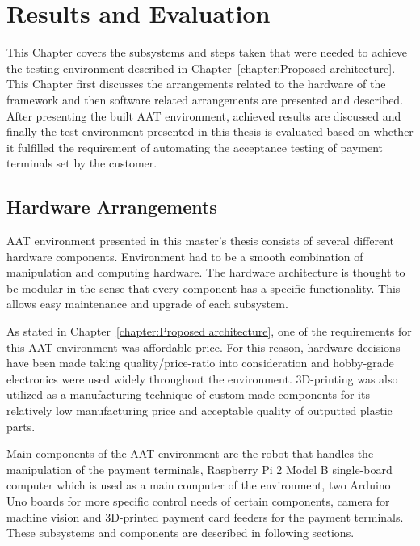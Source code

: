 
\chapter{Results and Evaluation}
\label{chapter:Results and Evaluation}

This Chapter covers the subsystems and steps taken that were needed to achieve the testing environment described in Chapter~\ref{chapter:Proposed architecture}. This Chapter first discusses the arrangements related to the hardware of the framework and then software related arrangements are presented and described. After presenting the built AAT environment, achieved results are discussed and finally the test environment presented in this thesis is evaluated based on whether it fulfilled the requirement of automating the acceptance testing of payment terminals set by the customer.

\section{Hardware Arrangements}
\label{section:Hardware arrangements}

AAT environment presented in this master's thesis consists of several different hardware components. Environment had to be a smooth combination of manipulation and computing hardware. The hardware architecture is thought to be modular in the sense that every component has a specific functionality. This allows easy maintenance and upgrade of each subsystem.

As stated in Chapter~\ref{chapter:Proposed architecture}, one of the requirements for this AAT environment was affordable price. For this reason, hardware decisions have been made taking quality/price-ratio into consideration and hobby-grade electronics were used widely throughout the environment. 3D-printing was also utilized as a manufacturing technique of custom-made components for its relatively low manufacturing price and acceptable quality of outputted plastic parts.

Main components of the AAT environment are the robot that handles the manipulation of the payment terminals, Raspberry Pi 2 Model B single-board computer which is used as a main computer of the environment, two Arduino Uno boards for more specific control needs of certain components, camera for machine vision and 3D-printed payment card feeders for the payment terminals. These subsystems and components are described in following sections.

